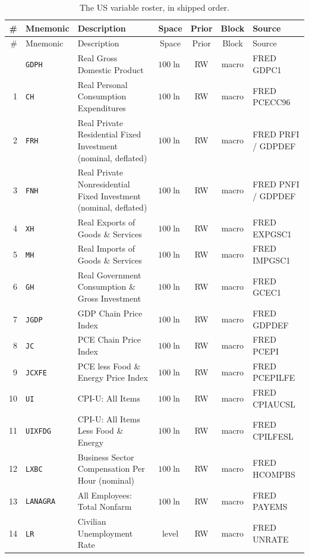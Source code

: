 \documentclass[11pt]{article}
\begin{document}
\begin{small}
\setlength{\tabcolsep}{4pt}
\begin{longtable}{r l p{5.9cm} c c c p{3.4cm}}
\caption{The US variable roster, in shipped order.}\label{tab:roster}\\
\toprule
\# & Mnemonic & Description & Space & Prior & Block & Source \\
\midrule
\endfirsthead
\toprule
\# & Mnemonic & Description & Space & Prior & Block & Source \\
\midrule
\endhead
\bottomrule
\endfoot
0 & \texttt{GDPH} & Real Gross Domestic Product & $100\ln$ & RW & macro & FRED GDPC1 \\
1 & \texttt{CH} & Real Personal Consumption Expenditures & $100\ln$ & RW & macro & FRED PCECC96 \\
2 & \texttt{FRH} & Real Private Residential Fixed Investment (nominal, deflated) & $100\ln$ & RW & macro & FRED PRFI / GDPDEF \\
3 & \texttt{FNH} & Real Private Nonresidential Fixed Investment (nominal, deflated) & $100\ln$ & RW & macro & FRED PNFI / GDPDEF \\
4 & \texttt{XH} & Real Exports of Goods \& Services & $100\ln$ & RW & macro & FRED EXPGSC1 \\
5 & \texttt{MH} & Real Imports of Goods \& Services & $100\ln$ & RW & macro & FRED IMPGSC1 \\
6 & \texttt{GH} & Real Government Consumption \& Gross Investment & $100\ln$ & RW & macro & FRED GCEC1 \\
7 & \texttt{JGDP} & GDP Chain Price Index & $100\ln$ & RW & macro & FRED GDPDEF \\
8 & \texttt{JC} & PCE Chain Price Index & $100\ln$ & RW & macro & FRED PCEPI \\
9 & \texttt{JCXFE} & PCE less Food \& Energy Price Index & $100\ln$ & RW & macro & FRED PCEPILFE \\
10 & \texttt{UI} & CPI-U: All Items & $100\ln$ & RW & macro & FRED CPIAUCSL \\
11 & \texttt{UIXFDG} & CPI-U: All Items Less Food \& Energy & $100\ln$ & RW & macro & FRED CPILFESL \\
12 & \texttt{LXBC} & Business Sector Compensation Per Hour (nominal) & $100\ln$ & RW & macro & FRED HCOMPBS \\
13 & \texttt{LANAGRA} & All Employees: Total Nonfarm & $100\ln$ & RW & macro & FRED PAYEMS \\
14 & \texttt{LR} & Civilian Unemployment Rate & level & RW & macro & FRED UNRATE \\

\end{longtable}
\end{small}
\end{document}
